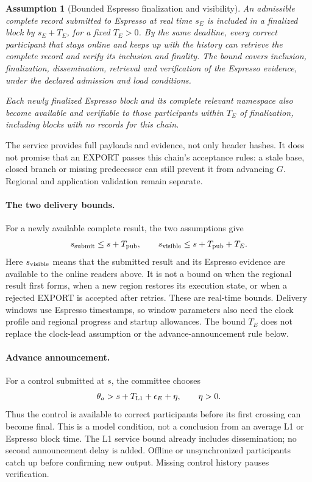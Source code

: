 \documentclass[11pt,a4paper]{article}
\newtheorem{assumption}[assumption]{Assumption}
\begin{document}
\begin{assumption}[Bounded Espresso finalization and visibility]
\label{ass:espresso-visibility}
An admissible complete record submitted to Espresso at real time $s_E$
is included in a finalized block by $s_E+T_E$, for a fixed $T_E>0$.
By the same deadline, every
correct participant that stays online and keeps up with the history can
retrieve the complete record and verify its inclusion and finality.
The bound covers inclusion, finalization, dissemination, retrieval and
verification of the Espresso evidence, under the declared admission and
load conditions.

Each newly finalized Espresso block and its complete relevant namespace
also become available and verifiable to those participants within $T_E$
of finalization, including blocks with no records for this chain.
\end{assumption}
The service provides full payloads and evidence, not only header hashes.
It does not promise that an EXPORT passes this chain's acceptance rules:
a stale base, closed branch or missing predecessor can still prevent it
from advancing $G$. Regional and application validation remain separate.

\paragraph{The two delivery bounds.}
For a newly available complete result, the two assumptions give
\[
 s_{\rm submit}\le s+T_{\rm pub},\qquad
 s_{\rm visible}\le s+T_{\rm pub}+T_E.
\]
Here $s_{\rm visible}$ means that the submitted result and its Espresso
evidence are available to the online readers above. It is not a bound on
when the regional result first forms, when a new region restores its
execution state, or when a rejected EXPORT is accepted after retries.
These are real-time bounds. Delivery windows use Espresso timestamps, so
window parameters also need the clock profile and regional progress and
startup allowances. The bound $T_E$ does not replace the clock-lead
assumption or the advance-announcement rule below.


\paragraph{Advance announcement.}
For a control submitted at $s$, the committee chooses
\[
 \theta_a>s+T_{\rm L1}+\epsilon_E+\eta,
 \qquad \eta>0.
\]
Thus the control is available to correct participants before its
first crossing can become final. This is a model condition, not a
conclusion from an average L1 or Espresso block time. The L1 service
bound already includes dissemination; no second announcement delay is
added. Offline or unsynchronized participants catch up before confirming
new output. Missing control history pauses verification.
\end{document}
